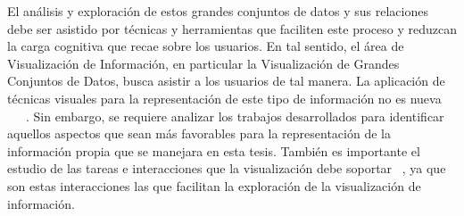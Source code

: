 El análisis y exploración de estos grandes conjuntos de datos y sus relaciones debe ser asistido por técnicas y herramientas que faciliten este proceso y reduzcan la carga cognitiva que recae sobre los usuarios. En tal sentido, el área de Visualización de Información, en particular la Visualización de Grandes Conjuntos de Datos, busca asistir a los usuarios de tal manera. La aplicación de técnicas visuales para la representación de este tipo de información no es nueva ~\cite{ref_article26}~\cite{ref_article27}~\cite{ref_article28}. Sin embargo, se requiere analizar los trabajos desarrollados para identificar aquellos aspectos que sean más favorables para la representación de la información propia que se manejara en esta tesis. También es importante el estudio de las tareas e interacciones que la visualización debe soportar ~\cite{ref_article29}, ya que son estas interacciones las que facilitan la exploración de la visualización de información.
